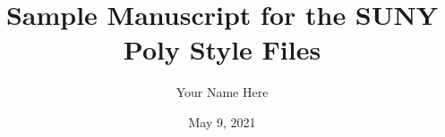 \documentclass[letterpaper,11pt]{report}
\title{Sample Manuscript for the SUNY Poly Style Files}
\author{Your Name Here}
\date{May 9, 2021} %
\begin{document}
%
\nocite{*}

\begin{romanpages}      %
\ApprovalPage   %
\TitlePage 
\CopyrightPage  %

%
%


%
%


%
%


\StylePage
\tableofcontents

%
\listoffigures
\listoftables

\end{romanpages}        %


\normalem       %



\end{document}
